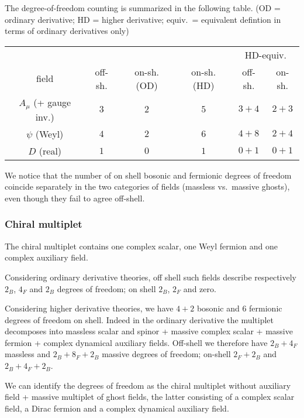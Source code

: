 The degree-of-freedom counting is summarized in the following table.
 (OD = ordinary derivative; HD = higher derivative; equiv.\ = equivalent defintion in terms of ordinary derivatives only)
\begin{table}[!ht]
\centering
\begin{tabular}{cccccc}
\hline \hline
  &   &   &   & \multicolumn{2}{c}{HD-equiv.} \\ 
field & off-sh.  & on-sh. (OD) & on-sh. (HD) & off-sh. & on-sh. \\  [0.75ex]
$A_\mu$ (+ gauge inv.) & $3$ & $2$ & $5$ & $3+4$ & $2+3$ \\ 
$\psi$ (Weyl) & $4$ & $2$ & $6$ & $4+8$ & $2+4$ \\ 
$D$ (real) &  $1$ & $0$ & $1$ & $0+1$ & $0+1$ \\ 
\hline \hline 
\end{tabular} 
\end{table}

We notice that the number of on shell bosonic and fermionic degrees of freedom coincide separately in the two categories of fields (massless vs.\ massive ghosts), even though they fail to agree off-shell.


\subsubsection{Chiral multiplet}

The chiral multiplet contains one complex scalar, one Weyl fermion and one complex auxiliary field.

Considering ordinary derivative theories, off shell such fields describe respectively $2_B$, $4_F$ and $2_B$ degrees of freedom; on shell $2_B$, $2_F$ and zero.

Considering higher derivative theories, we have $4+2$ bosonic and $6$ fermionic degrees of freedom on shell. Indeed in the ordinary derivative the multiplet decomposes into massless scalar and spinor + massive complex scalar + massive fermion + complex dynamical auxiliary fields. Off-shell we therefore have $2_B + 4_F$ massless and $2_B + 8_F + 2_B$ massive degrees of freedom; on-shell $2_F + 2_B  $ and $2_B + 4_F + 2_B$.

We can identify the degrees of freedom as the chiral multiplet without auxiliary field + massive multiplet of ghost fields, the latter consisting of a complex  scalar field, a Dirac fermion and a complex dynamical auxiliary field.


